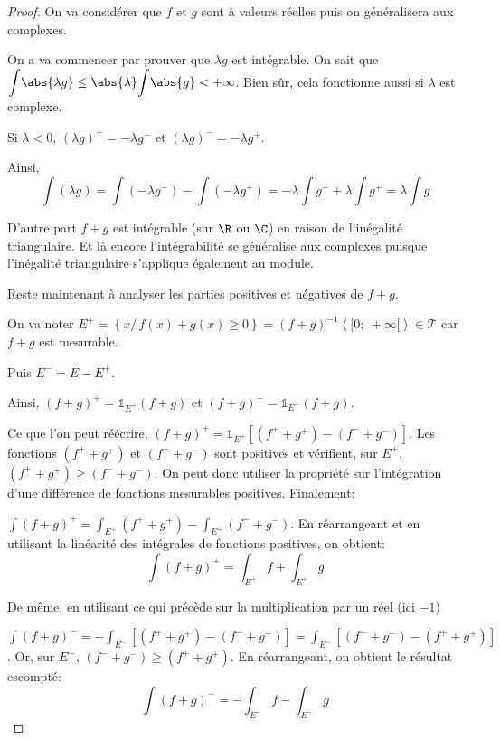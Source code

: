 \begin{proof}
On va considérer que $f$ et $g$ sont à valeurs réelles puis on généralisera aux complexes.

On a va commencer par prouver que $\lambda g$ est intégrable. On sait que $\displaystyle{\int} \abs{\lambda g} \leq \abs{\lambda} \displaystyle{\int} \abs{g} < +\infty$. Bien sûr, cela fonctionne aussi si $\lambda$ est complexe.

Si $\lambda < 0$, $\left(\lambda g\right)^{+} = -\lambda g^{-}$ et $\left(\lambda g\right)^{-} = -\lambda g^{+}$.

Ainsi,
\[
\displaystyle{\int} \left(\lambda g\right) = \displaystyle{\int} \left(-\lambda g^{-}\right) - \displaystyle{\int} \left(-\lambda g^{+}\right) = -\lambda \displaystyle{\int}  g^{-} +\lambda \displaystyle{\int}  g^{+} = \lambda \displaystyle{\int}  g
\]

D'autre part $f+g$ est intégrable (sur $\R$ ou $\C$) en raison de l'inégalité triangulaire. Et là encore l'intégrabilité se généralise aux complexes puisque l'inégalité triangulaire s'applique également au module.

Reste maintenant à analyser les parties positives et négatives de $f+g$.

On va noter $E^{+} = \left \{ x / \, f(x)+g(x) \geq 0 \right \} = (f+g)^{-1} \left<[0;~+\infty[\right> \in \mathcal{T}$ car $f+g$ est mesurable.

Puis $E^{-} = E-E^{+}$.

Ainsi, $(f+g)^{+} = \mathbb{1}_{E^{+}} (f+g)$ et $(f+g)^{-} = \mathbb{1}_{E^{-}} (f+g)$.

Ce que l'on peut réécrire, $(f+g)^{+} = \mathbb{1}_{E^{+}} \left[\left(f^{+}+g^{+}\right)-\left(f^{-}+g^{-}\right)\right]$. Les fonctions $(f^{+}+g^{+})$ et $(f^{-}+g^{-})$ sont positives et vérifient, sur $E^{+}$, $(f^{+}+g^{+}) \geq (f^{-}+g^{-})$. On peut donc utiliser la propriété sur l'intégration d'une différence de fonctions mesurables positives. Finalement:

$\displaystyle{\int} (f+g)^{+}  = \displaystyle{\int}_{E^{+}} (f^{+}+g^{+}) - \displaystyle{\int}_{E^{+}} (f^{-}+g^{-})$. En réarrangeant et en utilisant la linéarité des intégrales de fonctions positives, on obtient:
\[
\displaystyle{\int} (f+g)^{+} = \displaystyle{\int}_{E^{+}} f + \displaystyle{\int}_{E^{+}} g
\]

De même, en utilisant ce qui précède sur la multiplication par un réel (ici $-1$)

$\displaystyle{\int} (f+g)^{-}  = -\displaystyle{\int}_{E^{-}} \left[\left(f^{+}+g^{+}\right) - \left(f^{-}+g^{-}\right)\right] = \displaystyle{\int}_{E^{-}} \left[\left(f^{-}+g^{-}\right) - \left(f^{+}+g^{+}\right)\right]$. Or, sur $E^{-}$,  $(f^{-}+g^{-}) \geq (f^{+}+g^{+})$. En réarrangeant, on obtient le résultat escompté:
\[
\displaystyle{\int} (f+g)^{-} = -\displaystyle{\int}_{E^{-}} f - \displaystyle{\int}_{E^{-}} g
\]



\end{proof}
